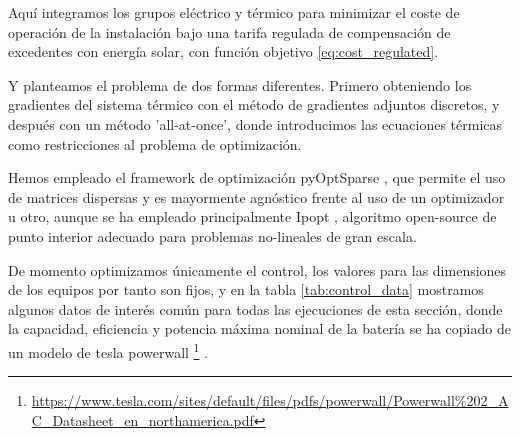 Aquí integramos los grupos eléctrico y térmico para minimizar el coste de
operación de la instalación bajo una tarifa regulada de compensación de
excedentes con energía solar, con función objetivo \eqref{eq:cost_regulated}.

Y planteamos el problema de dos formas diferentes. Primero obteniendo los
gradientes del sistema térmico con el método de gradientes adjuntos discretos,
y después con un método 'all-at-once', donde introducimos las ecuaciones
térmicas como restricciones al problema de optimización.

Hemos empleado el framework de optimización pyOptSparse \cite{Wu2020}, que
permite el uso de matrices dispersas y es mayormente agnóstico frente al uso de
un optimizador u otro, aunque se ha empleado principalmente Ipopt
\cite{wachter2006implementation}, algoritmo open-source de punto interior
adecuado para problemas no-lineales de gran escala.

De momento optimizamos únicamente el control, los valores para las dimensiones
de los equipos por tanto son fijos, y en la tabla \ref{tab:control_data}
mostramos algunos datos de interés común para todas las ejecuciones de esta
sección, donde la capacidad, eficiencia y potencia máxima nominal de la batería
se ha copiado de un modelo de tesla powerwall
\footnote{\url{https://www.tesla.com/sites/default/files/pdfs/powerwall/Powerwall\%202\_AC\_Datasheet\_en\_northamerica.pdf}}
.

